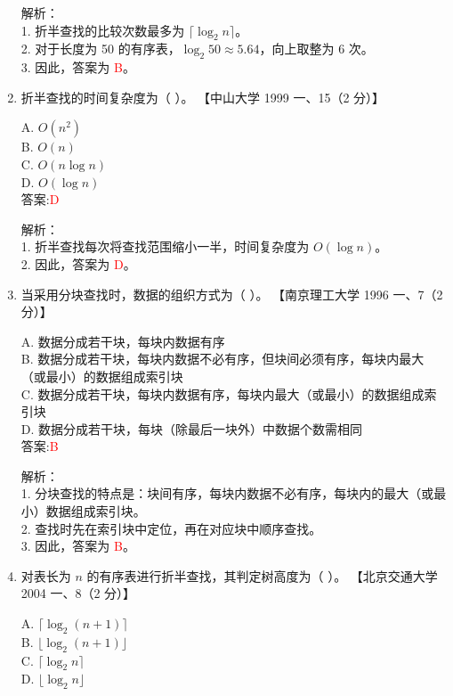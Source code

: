 \documentclass[lang=cn,newtx,10pt,scheme=chinese]{../../../elegantbook}
\begin{document}
\begin{enumerate}
    解析：\\
    1. 折半查找的比较次数最多为 $\lceil \log_2 n \rceil$。\\
    2. 对于长度为 50 的有序表，$\log_2 50 \approx 5.64$，向上取整为 6 次。\\
    3. 因此，答案为 \textcolor{red}{B}。\\

\item 折半查找的时间复杂度为（ ）。  
    【中山大学 1999 一、15（2 分）】  

    A. $O(n^2)$ \\  
    B. $O(n)$ \\  
    C. $O(n \log n)$ \\  
    D. $O(\log n)$ \\  

    答案:\textcolor{red}{D}

    解析：\\
    1. 折半查找每次将查找范围缩小一半，时间复杂度为 $O(\log n)$。\\
    2. 因此，答案为 \textcolor{red}{D}。\\

    \item 当采用分块查找时，数据的组织方式为（ ）。  
    【南京理工大学 1996 一、7（2 分）】  

    A. 数据分成若干块，每块内数据有序 \\  
    B. 数据分成若干块，每块内数据不必有序，但块间必须有序，每块内最大（或最小）的数据组成索引块 \\  
    C. 数据分成若干块，每块内数据有序，每块内最大（或最小）的数据组成索引块 \\  
    D. 数据分成若干块，每块（除最后一块外）中数据个数需相同 \\  

    答案:\textcolor{red}{B}

    解析：\\
    1. 分块查找的特点是：块间有序，每块内数据不必有序，每块内的最大（或最小）数据组成索引块。\\
    2. 查找时先在索引块中定位，再在对应块中顺序查找。\\
    3. 因此，答案为 \textcolor{red}{B}。\\

\item 对表长为 $n$ 的有序表进行折半查找，其判定树高度为（ ）。  
    【北京交通大学 2004 一、8（2 分）】  

    A. $\lceil \log_2(n+1) \rceil$ \\  
    B. $\lfloor \log_2(n+1) \rfloor$ \\  
    C. $\lceil \log_2 n \rceil$ \\  
    D. $\lfloor \log_2 n \rfloor$ \\  


\end{enumerate}
\end{document}
